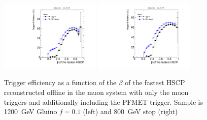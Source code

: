 

\begin{figure}
\centering
  \includegraphics[clip=true, trim=0.0cm 0cm 3.0cm 0cm, width=0.44\textwidth]{figures/search/Gluino_8TeV_M1200_f10MatchedSA}
  \includegraphics[clip=true, trim=0.0cm 0cm 3.0cm 0cm, width=0.44\textwidth]{figures/search/Stop_8TeV_M800MatchedSA}
      \caption[Trigger efficiency as a function of the $\beta$ of the fastest HSCP reconstructed offline in the muon system with only the muon triggers
and additionally including the PFMET trigger.]
{Trigger efficiency as a function of the $\beta$ of the fastest HSCP reconstructed offline in the muon system with only the muon triggers
and additionally including the PFMET trigger.
Sample is 1200~GeV Gluino $f=0.1$ (left) and 800~GeV stop (right)}
    \label{fig:TriggerEffVsBetaGl}
\end{figure}

